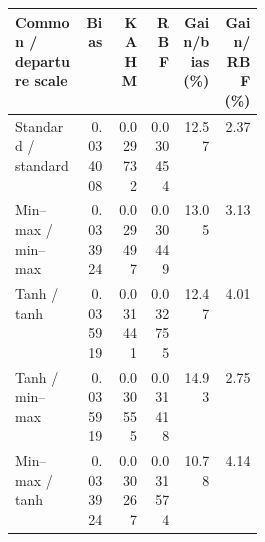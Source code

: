 \begin{tabular}{@{}p{0.29\linewidth}rrrrr@{}}
\toprule
Common / departure scale & Bias & KAHM & RBF & Gain/bias (\%) & Gain/RBF (\%) \\
\midrule
Standard / standard & 0.034008 & 0.029732 & 0.030454 & 12.57 & 2.37 \\
Min--max / min--max & 0.033924 & 0.029497 & 0.030449 & 13.05 & 3.13 \\
Tanh / tanh & 0.035919 & 0.031441 & 0.032755 & 12.47 & 4.01 \\
Tanh / min--max & 0.035919 & 0.030555 & 0.031418 & 14.93 & 2.75 \\
Min--max / tanh & 0.033924 & 0.030267 & 0.031574 & 10.78 & 4.14 \\
\bottomrule
\end{tabular}
